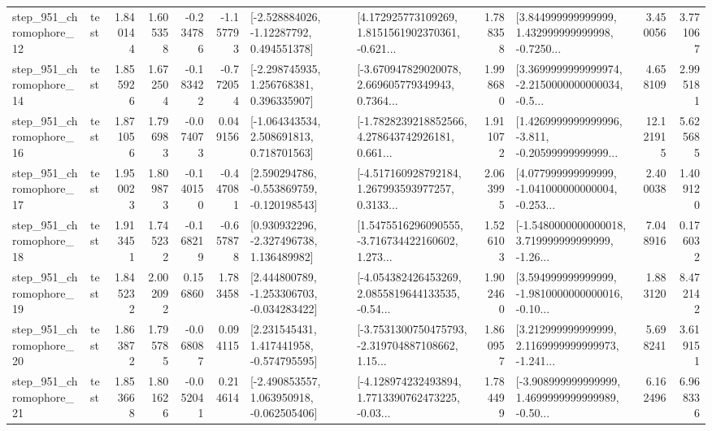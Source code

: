 \begin{tabular}{llrrrrllrlrr}
  step\_951\_chromophore\_12 &      test &      1.840144 &    1.605358 &     -0.234786 & -1.157793 &    [-2.528884026, -1.12287792, 0.494551378] &  [4.172925773109269, 1.8151561902370361, -0.621... &       1.788358 &  [3.844999999999999, 1.432999999999998, -0.7250... &            3.450056 &          3.771067 \\
  step\_951\_chromophore\_14 &      test &      1.855926 &    1.672504 &     -0.183422 & -0.772054 &    [-2.298745935, 1.256768381, 0.396335907] &  [-3.670947829020078, 2.669605779349943, 0.7364... &       1.998680 &  [3.3699999999999974, -2.2150000000000034, -0.5... &            4.658109 &          2.995181 \\
  step\_951\_chromophore\_16 &      test &      1.871056 &    1.796983 &     -0.074073 &  0.049156 &    [-1.064343534, 2.508691813, 0.718701563] &  [-1.7828239218852566, 4.278643742926181, 0.661... &       1.911072 &  [1.4269999999999996, -3.811, -0.20599999999999... &           12.121915 &          5.625685 \\
  step\_951\_chromophore\_17 &      test &      1.950023 &    1.809873 &     -0.140150 & -0.447081 &   [2.590294786, -0.553869759, -0.120198543] &  [-4.517160928792184, 1.267993593977257, 0.3133... &       2.063995 &  [4.077999999999999, -1.041000000000004, -0.253... &            2.400038 &          1.409120 \\
  step\_951\_chromophore\_18 &      test &      1.913451 &    1.745232 &     -0.168219 & -0.657878 &    [0.930932296, -2.327496738, 1.136489982] &  [1.5475516296090555, -3.716734422160602, 1.273... &       1.526103 &  [-1.5480000000000018, 3.719999999999999, -1.26... &            7.048916 &          0.176032 \\
  step\_951\_chromophore\_19 &      test &      1.845232 &    2.002092 &      0.156860 &  1.783458 &   [2.444800789, -1.253306703, -0.034283422] &  [-4.054382426453269, 2.0855819644133535, -0.54... &       1.902460 &  [3.594999999999999, -1.9810000000000016, -0.10... &            1.883120 &          8.472142 \\
  step\_951\_chromophore\_20 &      test &      1.863872 &    1.795785 &     -0.068087 &  0.094115 &    [2.231545431, 1.417441958, -0.574795595] &  [-3.7531300750475793, -2.319704887108662, 1.15... &       1.860957 &  [3.212999999999999, 2.1169999999999973, -1.241... &            5.698241 &          3.619151 \\
  step\_951\_chromophore\_21 &      test &      1.853668 &    1.801626 &     -0.052041 &  0.214614 &   [-2.490853557, 1.063950918, -0.062505406] &  [-4.128974232493894, 1.7713390762473225, -0.03... &       1.784499 &  [-3.908999999999999, 1.4699999999999989, -0.50... &            6.162496 &          6.968336 \\

\end{tabular}
